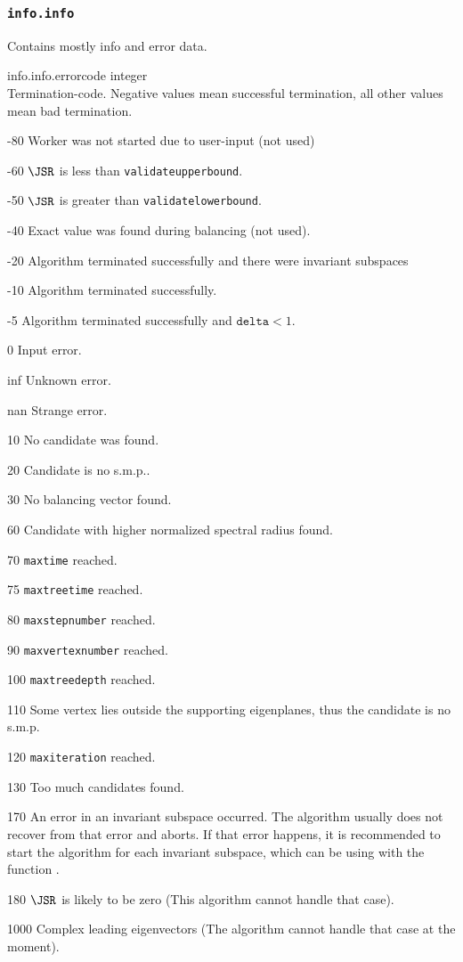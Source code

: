 \subsubsection{\texttt{info.info}} Contains mostly info and error data.
\begin{param}
\item[info.info.errorcode] integer\\Termination-code. Negative values mean successful termination, all other values mean bad termination.
\begin{param}[noitemsep]
\item[-80] Worker was not started due to user-input (not used)
\item[-60] $\JSR$ is less than \texttt{validateupperbound}.
\item[-50] $\JSR$ is greater than \texttt{validatelowerbound}.
\item[-40] Exact value was found during balancing (not used).
\item[-20] Algorithm terminated successfully and there were invariant subspaces
\item[-10] Algorithm terminated successfully.
\item[-5]  Algorithm terminated successfully and $\texttt{delta}<1$.
\item[0]   Input error.
\item[inf] Unknown error. 
\item[nan] Strange error.
\item[10]  No candidate was found.
\item[20]  Candidate is no s.m.p..
\item[30]  No balancing vector found.
\item[60]  Candidate with higher normalized spectral radius found.
\item[70]  \texttt{maxtime} reached.
\item[75]  \texttt{maxtreetime} reached.
\item[80]  \texttt{maxstepnumber} reached.
\item[90]  \texttt{maxvertexnumber} reached.
\item[100] \texttt{maxtreedepth} reached.
\item[110] Some vertex lies outside the supporting eigenplanes, thus the candidate is no s.m.p.
\item[120] \texttt{maxiteration} reached.
\item[130] Too much candidates found.
\item[170] An error in an invariant subspace occurred. The algorithm usually does not recover from that error and aborts. If that error happens, it is recommended to start the algorithm for each invariant subspace, which can be using with the function .
\item[180] $\JSR$ is likely to be zero (This algorithm cannot handle that case).
\item[1000] Complex leading eigenvectors (The algorithm cannot handle that case at the moment).
\end{param}


\end{param}
